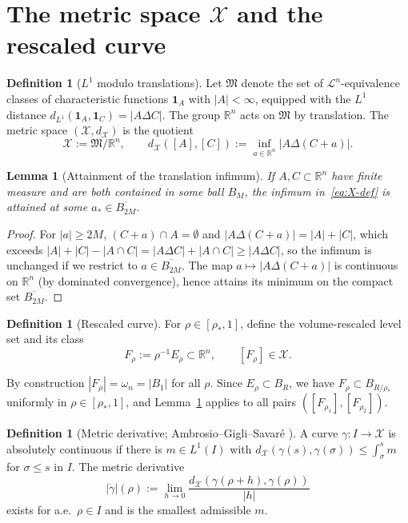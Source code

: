 \documentclass[11pt]{article}
\newtheorem{lemma}[theorem]{Lemma}
\theoremstyle{definition}
\newtheorem{definition}[theorem]{Definition}
\newcommand{\R}{\mathbb{R}}
\newcommand{\rstar}{\rho_{*}}
\newcommand{\X}{\mathcal X}
\begin{document}
\section{The metric space $\X$ and the rescaled curve}\label{sec:X}

\begin{definition}[$L^1$ modulo translations]\label{def:X}
Let $\mathfrak M$ denote the set of $\mathcal L^n$-equivalence classes of
characteristic functions $\mathbf 1_A$ with $|A|<\infty$, equipped with the
$L^1$ distance $d_{L^1}(\mathbf 1_A,\mathbf 1_C)=|A\Delta C|$. The group
$\R^n$ acts on $\mathfrak M$ by translation. The metric space
$(\X,d_\X)$ is the quotient
\begin{equation}\label{eq:X-def}
   \X:=\mathfrak M/\R^n,\qquad
   d_\X([A],[C]):=\inf_{a\in\R^n}|A\Delta(C+a)|.
\end{equation}
\end{definition}

\begin{lemma}[Attainment of the translation infimum]\label{lem:attain}
If $A,C\subset\R^n$ have finite measure and are both contained in some ball
$B_M$, the infimum in~\eqref{eq:X-def} is attained at some
$a_*\in\overline{B_{2M}}$.
\end{lemma}

\begin{proof}
For $|a|\ge 2M$, $(C+a)\cap A=\emptyset$ and $|A\Delta(C+a)|=|A|+|C|$, which
exceeds $|A|+|C|-|A\cap C|=|A\Delta C|+|A\cap C|\ge|A\Delta C|$, so the
infimum is unchanged if we restrict to $a\in\overline{B_{2M}}$. The map
$a\mapsto|A\Delta(C+a)|$ is continuous on $\R^n$ (by dominated convergence),
hence attains its minimum on the compact set $\overline{B_{2M}}$.
\end{proof}

\begin{definition}[Rescaled curve]\label{def:F}
For $\rho\in[\rstar,1]$, define the volume-rescaled level set and its class
\[
   F_\rho:=\rho^{-1}E_\rho\subset\R^n,\qquad [F_\rho]\in\X.
\]
\end{definition}

By construction $|F_\rho|=\omega_n=|B_1|$ for all $\rho$. Since
$E_\rho\subset B_R$, we have $F_\rho\subset B_{R/\rstar}$ uniformly in
$\rho\in[\rstar,1]$, and Lemma~\ref{lem:attain} applies to all pairs
$([F_{\rho_1}],[F_{\rho_2}])$.

\begin{definition}[Metric derivative; Ambrosio--Gigli--Savar\'e
{\cite[Thm.~1.1.2]{AGS2008}}]\label{def:AC}
A curve $\gamma:I\to\X$ is absolutely continuous if there is $m\in L^1(I)$
with $d_\X(\gamma(s),\gamma(\sigma))\le\int_\sigma^s m$ for
$\sigma\le s$ in $I$. The metric derivative
\[
   |\dot\gamma|(\rho):=\lim_{h\to 0}\frac{d_\X(\gamma(\rho+h),\gamma(\rho))}{|h|}
\]
exists for a.e.\ $\rho\in I$ and is the smallest admissible $m$.
\end{definition}
\end{document}
